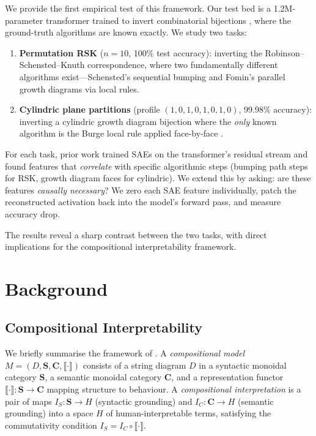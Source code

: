 \documentclass[10pt]{article}
\begin{document}
We provide the first empirical test of this framework. Our test bed is a
1.2M-parameter transformer trained to invert combinatorial bijections
\citep{langer2026rsk}, where the ground-truth algorithms are known exactly.
We study two tasks:

\begin{enumerate}
\item \textbf{Permutation RSK} ($n=10$, 100\% test accuracy): inverting the
Robinson--Schensted--Knuth correspondence, where two fundamentally different
algorithms exist---Schensted's sequential bumping and Fomin's parallel growth
diagrams via local rules.

\item \textbf{Cylindric plane partitions} (profile $(1,0,1,0,1,0,1,0)$,
99.98\% accuracy): inverting a cylindric growth diagram bijection where the
\emph{only} known algorithm is the Burge local rule applied face-by-face
\citep{langer2013}.
\end{enumerate}

For each task, prior work \citep{langer2026rsk} trained SAEs on the
transformer's residual stream and found features that \emph{correlate} with
specific algorithmic steps (bumping path steps for RSK, growth diagram faces
for cylindric). We extend this by asking: are these features \emph{causally
necessary}? We zero each SAE feature individually, patch the reconstructed
activation back into the model's forward pass, and measure accuracy drop.

The results reveal a sharp contrast between the two tasks, with direct
implications for the compositional interpretability framework.

\section{Background}

\subsection{Compositional Interpretability}

We briefly summarise the framework of \citet{gauderis2026}. A
\emph{compositional model} $M = (D, \mathbf{S}, \mathbf{C},
\llbracket\cdot\rrbracket)$ consists of a string diagram $D$ in a syntactic
monoidal category $\mathbf{S}$, a semantic monoidal category $\mathbf{C}$,
and a representation functor $\llbracket\cdot\rrbracket : \mathbf{S} \to
\mathbf{C}$ mapping structure to behaviour. A \emph{compositional
interpretation} is a pair of maps $I_S : \mathbf{S} \to H$ (syntactic
grounding) and $I_C : \mathbf{C} \to H$ (semantic grounding) into a space
$H$ of human-interpretable terms, satisfying the commutativity condition
$I_S = I_C \circ \llbracket\cdot\rrbracket$.
\end{document}
